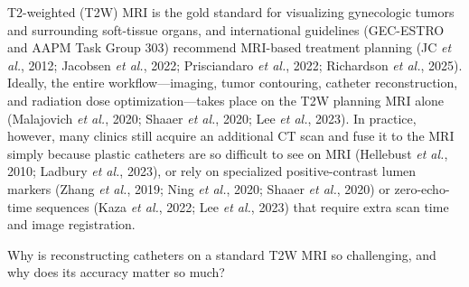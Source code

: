 \documentclass[
  11pt,
]{article}
\begin{document}
T2-weighted (T2W) MRI is the gold standard for visualizing gynecologic
tumors and surrounding soft-tissue organs, and international guidelines
(GEC-ESTRO and AAPM Task Group 303) recommend MRI-based treatment
planning (JC \emph{et al.}, 2012; Jacobsen \emph{et al.}, 2022;
Prisciandaro \emph{et al.}, 2022; Richardson \emph{et al.}, 2025).
Ideally, the entire workflow---imaging, tumor contouring, catheter
reconstruction, and radiation dose optimization---takes place on the T2W
planning MRI alone (Malajovich \emph{et al.}, 2020; Shaaer \emph{et
al.}, 2020; Lee \emph{et al.}, 2023). In practice, however, many clinics
still acquire an additional CT scan and fuse it to the MRI simply
because plastic catheters are so difficult to see on MRI (Hellebust
\emph{et al.}, 2010; Ladbury \emph{et al.}, 2023), or rely on
specialized positive-contrast lumen markers (Zhang \emph{et al.}, 2019;
Ning \emph{et al.}, 2020; Shaaer \emph{et al.}, 2020) or zero-echo-time
sequences (Kaza \emph{et al.}, 2022; Lee \emph{et al.}, 2023) that
require extra scan time and image registration.

Why is reconstructing catheters on a standard T2W MRI so challenging,
and why does its accuracy matter so much?
\end{document}

